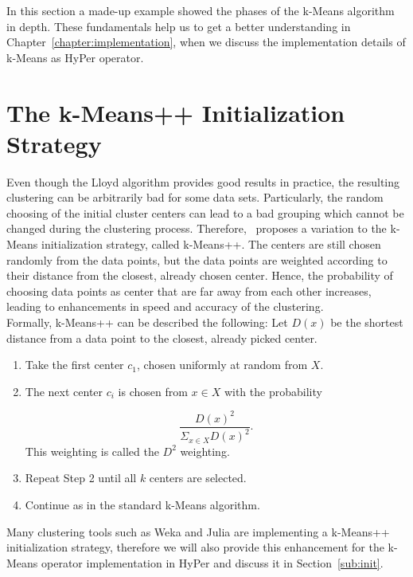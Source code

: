 In this section a made-up example showed the phases of the k-Means algorithm in depth. These fundamentals help us to get a better understanding in Chapter~\ref{chapter:implementation}, when we discuss the implementation details of k-Means as HyPer operator.



\section{The k-Means++ Initialization Strategy}\label{section:kmeans_init}

Even though the Lloyd algorithm provides good results in practice, the resulting clustering can be arbitrarily bad for some data sets. Particularly, the random choosing of the initial cluster centers can lead to a bad grouping which cannot be changed during the clustering process. Therefore,~\cite{kmeans++} proposes a variation to the k-Means initialization strategy, called k-Means++. The centers are still chosen randomly from the data points, but the data points are weighted according to their distance from the closest, already chosen center. Hence, the probability of choosing data points as center that are far away from each other increases, leading to enhancements in speed and accuracy of the clustering.
\\
Formally, k-Means++ can be described the following:
Let $D(x)$ be the shortest distance from a data point to the closest, already picked center.

\begin{enumerate} 
\item Take the first center $c_1$, chosen uniformly at random from $X$.
\item The next center $c_i$ is chosen from $x \in X$ with the probability 

\begin{equation*}
\frac {D(x)^2} {\Sigma_{x \in X} D(x)^2}.
\end{equation*}
This weighting is called the $D^2$ weighting.

\item Repeat Step 2 until all $k$ centers are selected.
\item Continue as in the standard k-Means algorithm.
\end{enumerate}

Many clustering tools such as Weka and Julia are implementing a k-Means++ initialization strategy, therefore we will also provide this enhancement for the k-Means operator implementation in HyPer and discuss it in Section~\ref{sub:init}.

